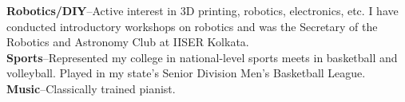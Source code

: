 \documentclass[10pt,a4paper]{article}
\begin{document}
\spacedhrule{1em}{-0.4em}


	  \textbf{Robotics/DIY}--Active interest in 3D printing,
     robotics, electronics, etc. I have conducted introductory workshops on
     robotics and was the Secretary of the Robotics and Astronomy Club at IISER
     Kolkata.\\
	  \textbf{Sports}--Represented my college in national-level sports
     meets in basketball and volleyball. Played in my state's Senior Division
     Men's Basketball League.\\
	  \textbf{Music}--Classically trained pianist.\\

\spacedhrule{1em}{-0.4em}
\end{document}
